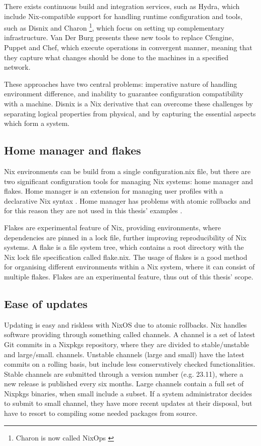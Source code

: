 There exists continuous build and integration services, such as Hydra,
which include Nix-compatible support for handling runtime
configuration and tools, such as Disnix and Charon \footnote{Charon is
now called NixOps \cite{githubNixNixpkgsNixOS}}, which focus on
setting up complementary infrastructure. Van Der Burg presents these
new tools to replace Cfengine, Puppet and Chef, which execute
operations in convergent manner, meaning that they capture what
changes should be done to the machines in a specified
network. \cite{van2013reference}

These approaches have two central problems: imperative nature of
handling environment difference, and inability to guarantee
configuration compatibility with a machine. Disnix is a Nix derivative
that can overcome these challenges by separating logical properties
from physical, and by capturing the essential aspects which form a
system. \cite{van2013reference}

\subsection{Home manager and flakes}

Nix environments can be build from a single configuration.nix file,
but there are two significant configuration tools for managing Nix
systems: home manager and flakes. Home manager is an extension for
managing user profiles with a declarative Nix syntax
\cite{nixcommunityHomeManager}. Home manager has problems with atomic
rollbacks and for this reason they are not used in this thesis'
examples \cite{nixcommunityHomeManager}.

Flakes are experimental feature of Nix, providing environments, where
dependencies are pinned in a lock file, further improving
reproducibility of Nix systems. A flake is a
file system tree, which contains a root directory with the Nix lock file
specification called flake.nix. The usage of flakes is a good method
for organising different environments within a Nix system, where it
can consist of multiple flakes. Flakes are an experimental
feature, thus out of this thesis' scope. \cite{nixosFlakesNixOS}

\subsection{Ease of updates}

Updating is easy and riskless with NixOS due to atomic
rollbacks. Nix handles software providing through something called
channels. A channel is a set of latest Git commits in a Nixpkgs
repository, where they are divided to stable/unstable and
large/small. channels. Unstable channels (large and small) have the
latest commits on a rolling basis, but include less conservatively
checked functionalities. Stable channels are submitted through a
version number (e.g. 23.11), where a new release is published every
six months. Large channels contain a full set of
Nixpkgs binaries, when small include a subset. If a system
administrator decides to submit to small channel, they have more
recent updates at their disposal, but have to resort to compiling some
needed packages from source. \cite{nixosChannelsNixOS}

